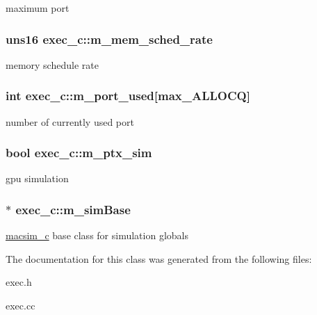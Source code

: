 \label{classexec__c_a386a95a928d3cbbd4e3b341fc126a221}
maximum port \hypertarget{classexec__c_acb8926be0087f6151906240e6edb2187}{
\subsubsection[{m\_\-mem\_\-sched\_\-rate}]{\setlength{\rightskip}{0pt plus 5cm}uns16 {\bf exec\_\-c::m\_\-mem\_\-sched\_\-rate}}}
\label{classexec__c_acb8926be0087f6151906240e6edb2187}
memory schedule rate \hypertarget{classexec__c_a9e3c198b31a9582d81a8e1cfb43506d5}{
\subsubsection[{m\_\-port\_\-used}]{\setlength{\rightskip}{0pt plus 5cm}int {\bf exec\_\-c::m\_\-port\_\-used}\mbox{[}max\_\-ALLOCQ\mbox{]}}}
\label{classexec__c_a9e3c198b31a9582d81a8e1cfb43506d5}
number of currently used port \hypertarget{classexec__c_a6899a3616f4198f872865b1fce3c1da3}{
\subsubsection[{m\_\-ptx\_\-sim}]{\setlength{\rightskip}{0pt plus 5cm}bool {\bf exec\_\-c::m\_\-ptx\_\-sim}}}
\label{classexec__c_a6899a3616f4198f872865b1fce3c1da3}
gpu simulation \hypertarget{classexec__c_a8e3440852a571730fd1a46b0685de778}{
\subsubsection[{m\_\-simBase}]{$\ast$ {\bf exec\_\-c::m\_\-simBase}}}
\label{classexec__c_a8e3440852a571730fd1a46b0685de778}
\hyperlink{classmacsim__c}{macsim\_\-c} base class for simulation globals 

The documentation for this class was generated from the following files:\begin{DoxyCompactItemize}
\item 
exec.h\item 
exec.cc\end{DoxyCompactItemize}
